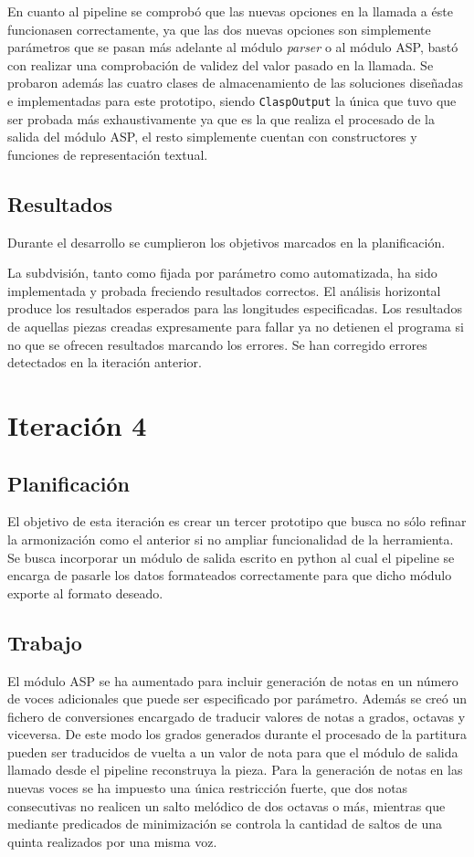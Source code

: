En cuanto al pipeline se comprobó que las nuevas opciones en la llamada a éste funcionasen correctamente, ya que las dos nuevas opciones son simplemente parámetros que se pasan más adelante al módulo \textit{parser} o al módulo ASP, bastó con realizar una comprobación de validez del valor pasado en la llamada. Se probaron además las cuatro clases de almacenamiento de las soluciones diseñadas e implementadas para este prototipo, siendo \texttt{ClaspOutput} la única que tuvo que ser probada más exhaustivamente ya que es la que realiza el procesado de la salida del módulo ASP, el resto simplemente cuentan con constructores y funciones de representación textual. 

\subsection{Resultados}
Durante el desarrollo se cumplieron los objetivos marcados en la planificación.

La subdvisión, tanto como fijada por parámetro como automatizada, ha sido implementada y probada freciendo resultados correctos. El análisis horizontal produce los resultados esperados para las longitudes especificadas. Los resultados de aquellas piezas creadas expresamente para fallar ya no detienen el programa si no que se ofrecen resultados marcando los errores. Se han corregido errores detectados en la iteración anterior.

\section{Iteración 4}

\subsection{Planificación}
El objetivo de esta iteración es crear un tercer prototipo que busca no sólo refinar la armonización como el anterior si no ampliar funcionalidad de la herramienta. Se busca incorporar un módulo de salida escrito en python al cual el pipeline se encarga de pasarle los datos formateados correctamente para que dicho módulo exporte al formato deseado. 

\subsection{Trabajo}
El módulo ASP se ha aumentado para incluir generación de notas en un número de voces adicionales que puede ser especificado por parámetro. Además se creó un fichero de conversiones encargado de traducir valores de notas a grados, octavas y viceversa. De este modo los grados generados durante el procesado de la partitura pueden ser traducidos de vuelta a un valor de nota para que el módulo de salida llamado desde el pipeline reconstruya la pieza. Para la generación de notas en las nuevas voces se ha impuesto una única restricción fuerte, que dos notas consecutivas no realicen un salto melódico de dos octavas o más, mientras que mediante predicados de minimización se controla la cantidad de saltos de una quinta realizados por una misma voz.

